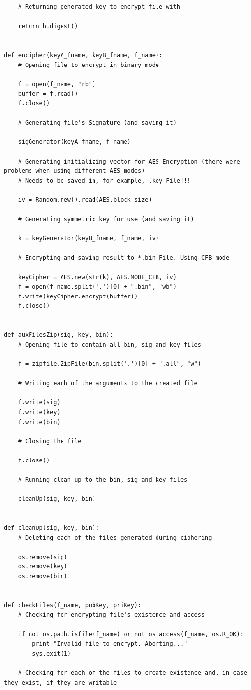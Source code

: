 \documentclass[a4paper,11pt,openright,oneside]{report}
\begin{document}
\begin{verbatim}
    # Returning generated key to encrypt file with

    return h.digest()


def encipher(keyA_fname, keyB_fname, f_name):
    # Opening file to encrypt in binary mode

    f = open(f_name, "rb")
    buffer = f.read()
    f.close()

    # Generating file's Signature (and saving it)

    sigGenerator(keyA_fname, f_name)

    # Generating initializing vector for AES Encryption (there were problems when using different AES modes)
    # Needs to be saved in, for example, .key File!!!

    iv = Random.new().read(AES.block_size)

    # Generating symmetric key for use (and saving it)

    k = keyGenerator(keyB_fname, f_name, iv)

    # Encrypting and saving result to *.bin File. Using CFB mode

    keyCipher = AES.new(str(k), AES.MODE_CFB, iv)
    f = open(f_name.split('.')[0] + ".bin", "wb")
    f.write(keyCipher.encrypt(buffer))
    f.close()


def auxFilesZip(sig, key, bin):
    # Opening file to contain all bin, sig and key files

    f = zipfile.ZipFile(bin.split('.')[0] + ".all", "w")

    # Writing each of the arguments to the created file

    f.write(sig)
    f.write(key)
    f.write(bin)

    # Closing the file

    f.close()

    # Running clean up to the bin, sig and key files

    cleanUp(sig, key, bin)


def cleanUp(sig, key, bin):
    # Deleting each of the files generated during ciphering

    os.remove(sig)
    os.remove(key)
    os.remove(bin)


def checkFiles(f_name, pubKey, priKey):
    # Checking for encrypting file's existence and access

    if not os.path.isfile(f_name) or not os.access(f_name, os.R_OK):
        print "Invalid file to encrypt. Aborting..."
        sys.exit(1)

    # Checking for each of the files to create existence and, in case they exist, if they are writable


\end{verbatim}
\end{document}

